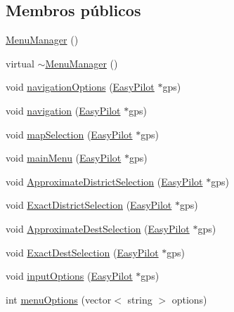 \subsection*{Membros públicos}
\begin{DoxyCompactItemize}
\item 
\hyperlink{classstd_1_1_menu_manager_a0e57899dfa981f18aa39890638a0d131}{Menu\+Manager} ()
\item 
virtual \hyperlink{classstd_1_1_menu_manager_a2e39acf092dd4a46e904ca141088bcd1}{$\sim$\+Menu\+Manager} ()
\item 
void \hyperlink{classstd_1_1_menu_manager_a6b49d6cd4fe3260d9642dbb20381f43c}{navigation\+Options} (\hyperlink{class_easy_pilot}{Easy\+Pilot} $\ast$gps)
\item 
void \hyperlink{classstd_1_1_menu_manager_a07bff9624aa3fc9104ec98c79b8c37a1}{navigation} (\hyperlink{class_easy_pilot}{Easy\+Pilot} $\ast$gps)
\item 
void \hyperlink{classstd_1_1_menu_manager_a77cd2018d2592e12d39dd07eb6f21022}{map\+Selection} (\hyperlink{class_easy_pilot}{Easy\+Pilot} $\ast$gps)
\item 
void \hyperlink{classstd_1_1_menu_manager_a638c286f464bf2d495aa2b4fb213302e}{main\+Menu} (\hyperlink{class_easy_pilot}{Easy\+Pilot} $\ast$gps)
\item 
void \hyperlink{classstd_1_1_menu_manager_abed94057ed99af5fc35be97742359585}{Approximate\+District\+Selection} (\hyperlink{class_easy_pilot}{Easy\+Pilot} $\ast$gps)
\item 
void \hyperlink{classstd_1_1_menu_manager_a9d27786670fa4ccfec164863eec87b4a}{Exact\+District\+Selection} (\hyperlink{class_easy_pilot}{Easy\+Pilot} $\ast$gps)
\item 
void \hyperlink{classstd_1_1_menu_manager_aa15f39e5d4c32479e5487be2e1b38d67}{Approximate\+Dest\+Selection} (\hyperlink{class_easy_pilot}{Easy\+Pilot} $\ast$gps)
\item 
void \hyperlink{classstd_1_1_menu_manager_a2ffb71762aba39d2d9e0233e7bc88f92}{Exact\+Dest\+Selection} (\hyperlink{class_easy_pilot}{Easy\+Pilot} $\ast$gps)
\item 
void \hyperlink{classstd_1_1_menu_manager_a430a4b321213835da37750a9bd565865}{input\+Options} (\hyperlink{class_easy_pilot}{Easy\+Pilot} $\ast$gps)
\item 
int \hyperlink{classstd_1_1_menu_manager_a1235a2b53d90aeb5f60c043be9caf62b}{menu\+Options} (vector$<$ string $>$ options)
\end{DoxyCompactItemize}


